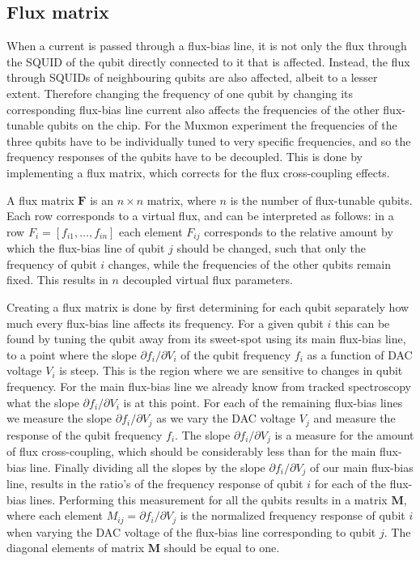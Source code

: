       \subsection{Flux matrix}
        \label{ssec:Flux matrix}
        When a current is passed through a flux-bias line, it is not only the flux through the SQUID of the qubit directly connected to it that is affected. Instead, the flux through SQUIDs of neighbouring qubits are also affected, albeit to a lesser extent. Therefore changing the frequency of one qubit by changing its corresponding flux-bias line current also affects the frequencies of the other flux-tunable qubits on the chip. For the Muxmon experiment the frequencies of the three qubits have to be individually tuned to very specific frequencies, and so the frequency responses of the qubits have to be decoupled. This is done by implementing a flux matrix, which corrects for the flux cross-coupling effects.

        A flux matrix $\boldsymbol{F}$ is an $n \times n$ matrix, where $n$ is the number of flux-tunable qubits. Each row corresponds to a virtual flux, and can be interpreted as follows: in a row $F_i = \left[f_{i1}, \dots, f_{in}\right]$ each element $F_{ij}$ corresponds to the relative amount by which the flux-bias line of qubit $j$ should be changed, such that only the frequency of qubit $i$ changes, while the frequencies of the other qubits remain fixed. This results in $n$ decoupled virtual flux parameters.

        Creating a flux matrix is done by first determining for each qubit separately how much every flux-bias line affects its frequency. For a given qubit $i$ this can be found by tuning the qubit away from its sweet-spot using its main flux-bias line, to a point where the slope $\partial f_i/\partial V_i$ of the qubit frequency $f_i$ as a function of DAC voltage $V_i$ is steep. This is the region where we are sensitive to changes in qubit frequency. For the main flux-bias line we already know from tracked spectroscopy what the slope $\partial f_i / \partial V_i$ is at this point. For each of the remaining flux-bias lines we measure the slope $\partial f_i / \partial V_j$ as we vary the DAC voltage $V_j$ and measure the response of the qubit frequency $f_i$. The slope $\partial f_i / \partial V_j$ is a measure for the amount of flux cross-coupling, which should be considerably less than for the main flux-bias line. Finally dividing all the slopes by the slope $\partial f_i / \partial V_j$ of our main flux-bias line, results in the ratio's of the frequency response of qubit $i$ for each of the flux-bias lines. Performing this measurement for all the qubits results in a matrix $\boldsymbol{M}$, where each element $M_{ij}=\partial f_i / \partial V_j$ is the normalized frequency response of qubit $i$ when varying the DAC voltage of the flux-bias line corresponding to qubit $j$. The diagonal elements of matrix $\boldsymbol{M}$ should be equal to one.

